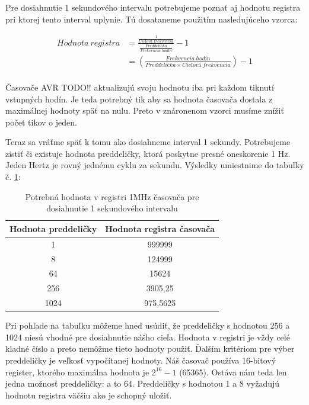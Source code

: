 Pre dosiahnutie 1 sekundového intervalu potrebujeme poznať aj hodnotu registra
pri ktorej tento interval uplynie. Tú dosataneme použitím nasledujúceho vzorca:

\begin{equation}
    \begin{aligned}
        Hodnota\:registra & = \frac{ \frac{1}{Cieľová\:frekvencia}} { \frac{Preddelička}{Frekvencia\:hodín}} - 1 \\
                          & = (\frac{Frekvencia\:hodín}{Preddelička \times Cieľová\:frekvencia}) - 1             \\
    \end{aligned}
\end{equation}

Časovače AVR TODO!! aktualizujú svoju hodnotu iba pri každom tiknutí vstupných hodín. Je teda potrebný tik aby sa hodnota časovača dostala z maximálnej hodnoty späť na nulu. Preto v znáronenom vzorci
musíme znížiť počet tikov o jeden. \par

Teraz sa vráťme späť k tomu ako dosiahneme interval 1 sekundy. Potrebujeme zistiť či existuje hodnota preddeličky, ktorá poskytne presné oneskorenie 1 Hz. Jeden Hertz je rovný jednému cyklu za sekundu.
Výsledky umiestnime do tabuľky č. \ref{table:timerPrescalerValues}:

\begin{table}[!htbp]
    \begin{center}
        \begin{tabular}{|c|c|}
            \hline
            Hodnota preddeličky & Hodnota registra časovača \\
            \hline
            1                   & 999999                    \\
            8                   & 124999                    \\
            64                  & 15624                     \\
            256                 & 3905,25                   \\
            1024                & 975,5625                  \\
            \hline
        \end{tabular}
        \caption{Potrebná hodnota v registri 1MHz časovača pre dosiahnutie 1 sekundového intervalu}
        \label{table:timerPrescalerValues}
    \end{center}
\end{table}

Pri pohľade na tabuľku môžeme hneď usúdiť, že preddeličky s hodnotou 256 a 1024 niesú vhodné pre dosiahnutie nášho cieľa. Hodnota v registri je vždy celé kladné číslo a preto nemôžme tieto hodnoty použiť. Ďalším kritériom pre výber preddeličky je veľkosť vypočítanej hodnoty. Náš časovač používa 16-bitový register, ktorého maximálna hodnota je $2^{16} -1$ (65365). Ostáva nám teda len jedna možnosť preddeličky: a to 64. Preddeličky s hodnotou 1 a 8 vyžadujú hodnotu registra väčšiu ako je schopný uložiť.